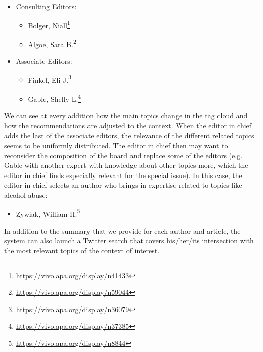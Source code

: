\begin{itemize}
  \item Consulting Editors:
  \begin{itemize}
    \item Bolger, Niall\footnote{\url{https://vivo.apa.org/display/n41433}}
    \item Algoe, Sara B.\footnote{\url{https://vivo.apa.org/display/n59044}}
  \end{itemize}
  \item Associate Editors:
  \begin{itemize}
      \item Finkel, Eli J.\footnote{\url{https://vivo.apa.org/display/n36079}}
      \item Gable, Shelly L.\footnote{\url{https://vivo.apa.org/display/n37385}}
  \end{itemize}
\end{itemize}
We can see at every addition how the main topics change in the tag cloud and how the recommendations are adjusted to the context. When the editor in chief adds the last of the associate editors, the relevance of the different related topics seems to be uniformly distributed. The editor in chief then may want to reconsider the composition of the board and replace some of the editors (e.g. Gable with another expert with knowledge about other topics more, which the editor in chief finds especially relevant for the special issue).  In this case, the editor in chief selects an author who brings in expertise related to topics like alcohol abuse:
\begin{itemize}
  \item Zywiak, William H.\footnote{\url{https://vivo.apa.org/display/n8844}}
\end{itemize}
In addition to the summary that we provide for each author and article, the system can also launch a Twitter search that covers his/her/its intersection with the most relevant topics of the context of interest.
